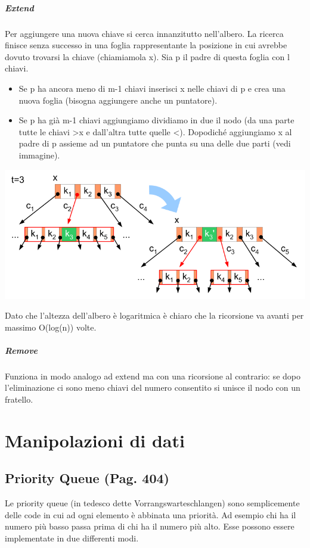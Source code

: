 \documentclass[a4paper]{book}
\begin{document}
\paragraph{Extend}
Per aggiungere una nuova chiave si cerca innanzitutto nell'albero. La ricerca finisce senza successo in una foglia rappresentante la posizione in cui avrebbe dovuto trovarsi la chiave (chiamiamola x). Sia p il padre di questa foglia con l chiavi. 
\begin{itemize}
\item Se p ha ancora meno di m-1 chiavi inserisci x nelle chiavi di p e crea una nuova foglia (bisogna aggiungere anche un puntatore).
\item Se p ha già m-1 chiavi aggiungiamo  dividiamo in due il nodo (da una parte tutte le chiavi >x e dall'altra tutte quelle <). Dopodiché aggiungiamo x al padre di p assieme ad un puntatore che punta su una delle due parti (vedi immagine). 
\end{itemize}
\begin{center}
\includegraphics[scale=0.5]{Figures/bbaumadd.png}
\end{center}
Dato che l'altezza dell'albero è logaritmica è chiaro che la ricorsione va avanti per massimo O(log(n)) volte.
\paragraph{Remove}
Funziona in modo analogo ad extend ma con una ricorsione al contrario: se dopo l'eliminazione ci sono meno chiavi del numero consentito si unisce il nodo con un fratello.
\chapter{Manipolazioni di dati}
\section{Priority Queue (Pag. 404)}
Le priority queue (in tedesco dette Vorrangswarteschlangen) sono semplicemente delle code in cui ad ogni elemento è abbinata una priorità. Ad esempio chi ha il numero più basso passa prima di chi ha il numero più alto. Esse possono essere implementate in due differenti modi.
\end{document}
